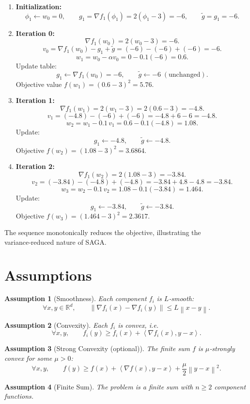 \documentclass{article}
\newcommand{\R}{\mathbb{R}}
\newcommand{\norm}[1]{\left\|#1\right\|}
\newcommand{\ip}[2]{\left\langle #1,#2\right\rangle}
\newtheorem{assumption}{Assumption}
\begin{document}
\begin{enumerate}[label=\textbf{Iter \arabic*:}, leftmargin=*]
\item \textbf{Initialization:}
\[
\phi_1\gets w_0=0,\qquad g_1=\nabla f_1(\phi_1)=2(\phi_1-3)=-6,
\qquad \tilde g=g_1=-6.
\]

\item \textbf{Iteration 0:}
\[
\nabla f_{1}(w_0)=2(w_0-3)=-6.
\]
\[
v_0 = \nabla f_1(w_0)-g_1+\tilde g = (-6)-(-6)+(-6) = -6.
\]
\[
w_1 = w_0-\alpha v_0 = 0-0.1(-6)=0.6.
\]
Update table:
\[
g_1\gets \nabla f_1(w_0)=-6,\qquad \tilde g\gets -6 \;(\text{unchanged}).
\]
Objective value $f(w_1)=(0.6-3)^2=5.76$.

\item \textbf{Iteration 1:}
\[
\nabla f_1(w_1)=2(w_1-3)=2(0.6-3)=-4.8.
\]
\[
v_1 = (-4.8)-(-6)+(-6)= -4.8+6-6 = -4.8.
\]
\[
w_2 = w_1-0.1\,v_1 = 0.6-0.1(-4.8)=1.08.
\]
Update:
\[
g_1\gets -4.8,\qquad \tilde g\gets -4.8.
\]
Objective $f(w_2)=(1.08-3)^2=3.6864$.

\item \textbf{Iteration 2:}
\[
\nabla f_1(w_2)=2(1.08-3)=-3.84.
\]
\[
v_2 = (-3.84)-(-4.8)+(-4.8)= -3.84+4.8-4.8 = -3.84.
\]
\[
w_3 = w_2-0.1\,v_2 = 1.08-0.1(-3.84)=1.464.
\]
Update:
\[
g_1\gets -3.84,\qquad \tilde g\gets -3.84.
\]
Objective $f(w_3)=(1.464-3)^2=2.3617$.
\end{enumerate}
The sequence monotonically reduces the objective, illustrating the variance‑reduced nature of SAGA.

\newpage
\section*{Assumptions}
\begin{assumption}[Smoothness]\label{as:smooth}
Each component $f_i$ is $L$‑smooth:
\[
\forall x,y\in\R^{d},\qquad 
\norm{\nabla f_i(x)-\nabla f_i(y)}\le L\norm{x-y}.
\]
\end{assumption}
\begin{assumption}[Convexity]\label{as:convex}
Each $f_i$ is convex, i.e.
\[
\forall x,y,\qquad 
f_i(y)\ge f_i(x)+\ip{\nabla f_i(x)}{y-x}.
\]
\end{assumption}
\begin{assumption}[Strong Convexity (optional)]\label{as:strong}
The finite sum $f$ is $\mu$‑strongly convex for some $\mu>0$:
\[
\forall x,y,\qquad 
f(y)\ge f(x)+\ip{\nabla f(x)}{y-x}+\frac{\mu}{2}\norm{y-x}^2 .
\]
\end{assumption}
\begin{assumption}[Finite Sum]\label{as:finite}
The problem is a finite sum with $n\ge 2$ component functions.
\end{assumption}
\end{document}
